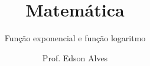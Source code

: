 \title{Matemática}
\subtitle{Função exponencial e função logaritmo}
\date{}
\author{Prof. Edson Alves}
